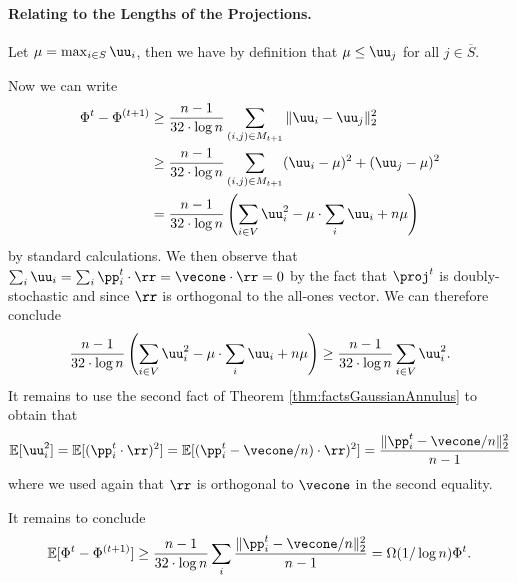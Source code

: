 \paragraph{Relating to the Lengths of the Projections.} Let $\mu = \max_{i \in S} \uu_i$, then we have by definition that $\mu \leq \uu_j$ for all $j \in \overline{S}$.

Now we can write 
\begin{align*}
     \Phi^{t} - \Phi^{(t+1)} &\geq \frac{n-1}{32 \cdot \log n} \sum_{(i,j) \in M_{t+1}} \|\uu_i - \uu_j\|^2_2 \\
     &\geq  \frac{n-1}{32 \cdot \log n} \sum_{(i,j) \in M_{t+1}}  (\uu_i - \mu)^2 + (\uu_j - \mu)^2\\
     &=  \frac{n-1}{32 \cdot \log n}\left( \sum_{i \in V} \uu_i^2 - \mu \cdot \sum_i \uu_i + n \mu \right)
\end{align*}
by standard calculations. We then observe that $\sum_i \uu_i = \sum_i \pp_i^t \cdot \rr = \vecone \cdot \rr = 0$ by the fact that $\proj^t$ is doubly-stochastic and since $\rr$ is orthogonal to the all-ones vector. We can therefore conclude 
\[
\frac{n-1}{32 \cdot \log n}\left( \sum_{i \in V} \uu_i^2 - \mu \cdot \sum_i \uu_i + n \mu \right) \geq \frac{n-1}{32 \cdot \log n} \sum_{i \in V} \uu_i^2.
\]
It remains to use the second fact of Theorem \ref{thm:factsGaussianAnnulus} to obtain that 
\[
\mathbb{E}[\uu_i^2] = \mathbb{E}[(\pp_i^t \cdot \rr)^2] = \mathbb{E}[(\pp_i^t - \vecone/n) \cdot \rr)^2] = \frac{\|\pp_i^t - \vecone/n\|_2^2}{n-1}
\]
where we used again that $\rr$ is orthogonal to $\vecone$ in the second equality.

It remains to conclude 
\[
\mathbb{E}[\Phi^{t} - \Phi^{(t+1)}] \geq \frac{n-1}{32 \cdot \log n} \sum_{i} \frac{\|\pp_i^t - \vecone/n\|_2^2}{n-1} = \Omega(1/\log n) \Phi^t.
\]